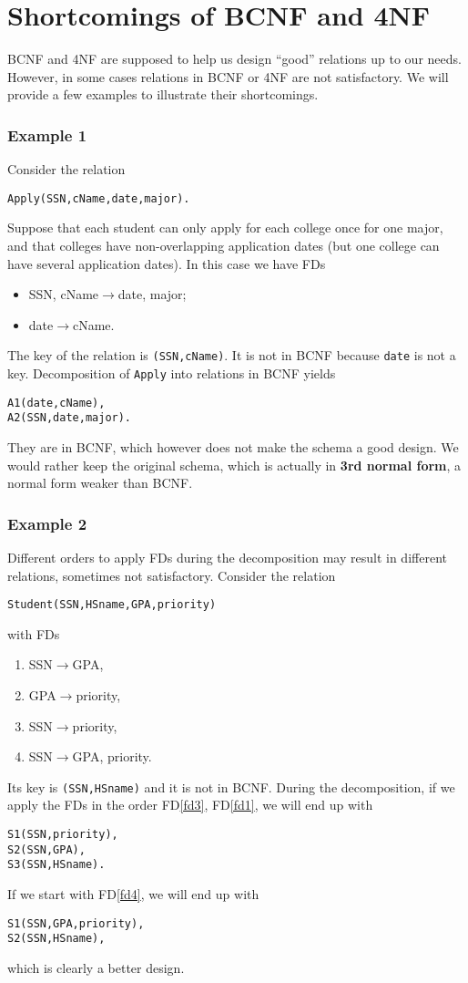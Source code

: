 \section{Shortcomings of BCNF and 4NF}
BCNF and 4NF are supposed to help us design ``good'' relations up to our needs. However, in some cases relations in BCNF or 4NF are not satisfactory. We will provide a few examples to illustrate their shortcomings.
\subsubsection{Example 1}
Consider the relation
\begin{lstlisting}
Apply(SSN,cName,date,major).
\end{lstlisting}
Suppose that each student can only apply for each college once for one major, and that colleges have non-overlapping application dates (but one college can have several application dates). In this case we have FDs
\begin{itemize}
\item SSN, cName$\rightarrow$date, major;
\item date$\rightarrow$cName.
\end{itemize}
The key of the relation is \texttt{(SSN,cName)}. It is not in BCNF because \texttt{date} is not a key. Decomposition of \texttt{Apply} into relations in BCNF yields
\begin{lstlisting}
A1(date,cName),
A2(SSN,date,major).
\end{lstlisting}
They are in BCNF, which however does not make the schema a good design. We would rather keep the original schema, which is actually in \textbf{3rd normal form}, a normal form weaker than BCNF.
\subsubsection{Example 2}
Different orders to apply FDs during the decomposition may result in different relations, sometimes not satisfactory. Consider the relation
\begin{lstlisting}
Student(SSN,HSname,GPA,priority)
\end{lstlisting}
with FDs
\begin{enumerate}
\item \label{fd1}SSN$\rightarrow$GPA,
\item \label{fd2}GPA$\rightarrow$priority,
\item \label{fd3}SSN$\rightarrow$priority,
\item \label{fd4}SSN$\rightarrow$GPA, priority.
\end{enumerate}
Its key is \texttt{(SSN,HSname)} and it is not in BCNF. During the decomposition, if we apply the FDs in the order FD\ref{fd3}, FD\ref{fd1}, we will end up with
\begin{lstlisting}
S1(SSN,priority),
S2(SSN,GPA),
S3(SSN,HSname).
\end{lstlisting}
If we start with FD\ref{fd4}, we will end up with
\begin{lstlisting}
S1(SSN,GPA,priority),
S2(SSN,HSname),
\end{lstlisting}
which is clearly a better design.

